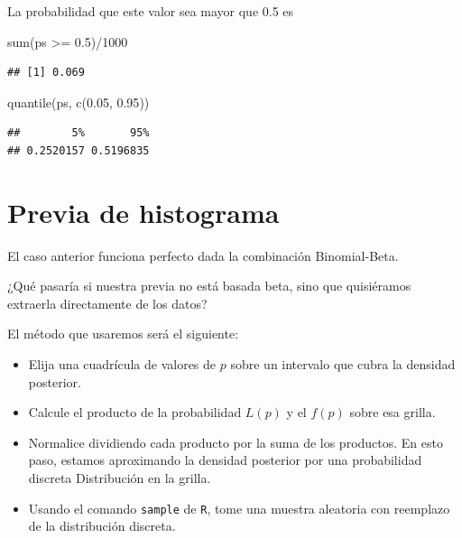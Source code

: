\documentclass[
  12pt,
]{book}
\newenvironment{Shaded}{\begin{snugshade}}{\end{snugshade}}
\newcommand{\DecValTok}[1]{\textcolor[rgb]{0.00,0.00,0.81}{#1}}
\newcommand{\FloatTok}[1]{\textcolor[rgb]{0.00,0.00,0.81}{#1}}
\newcommand{\FunctionTok}[1]{\textcolor[rgb]{0.00,0.00,0.00}{#1}}
\newcommand{\NormalTok}[1]{#1}
\newcommand{\SpecialCharTok}[1]{\textcolor[rgb]{0.00,0.00,0.00}{#1}}
\providecommand{\tightlist}{%
  \setlength{\itemsep}{0pt}\setlength{\parskip}{0pt}}
\theoremstyle{definition}
\theoremstyle{definition}
\theoremstyle{definition}
\theoremstyle{remark}
\begin{document}
La probabilidad que este valor sea mayor que 0.5 es

\begin{Shaded}
\begin{Highlighting}[]
\FunctionTok{sum}\NormalTok{(ps }\SpecialCharTok{\textgreater{}=} \FloatTok{0.5}\NormalTok{)}\SpecialCharTok{/}\DecValTok{1000}
\end{Highlighting}
\end{Shaded}

\begin{verbatim}
## [1] 0.069
\end{verbatim}

\begin{Shaded}
\begin{Highlighting}[]
\FunctionTok{quantile}\NormalTok{(ps, }\FunctionTok{c}\NormalTok{(}\FloatTok{0.05}\NormalTok{, }\FloatTok{0.95}\NormalTok{))}
\end{Highlighting}
\end{Shaded}

\begin{verbatim}
##        5%       95% 
## 0.2520157 0.5196835
\end{verbatim}

\hypertarget{previa-de-histograma}{%
\section{Previa de histograma}\label{previa-de-histograma}}

El caso anterior funciona perfecto dada la combinación Binomial-Beta.

¿Qué pasaría si nuestra previa no está basada beta, sino que
quisiéramos extraerla directamente de los datos?

El método que usaremos será el siguiente:

\begin{itemize}
\tightlist
\item
  Elija una cuadrícula de valores de \(p\) sobre un intervalo que cubra
  la densidad posterior.
\item
  Calcule el producto de la probabilidad \(L (p)\) y el \(f (p)\) sobre
  esa grilla.
\item
  Normalice dividiendo cada producto por la suma de los productos. En
  esto paso, estamos aproximando la densidad posterior por una
  probabilidad discreta Distribución en la grilla.
\item
  Usando el comando \texttt{sample} de \texttt{R}, tome una muestra aleatoria con
  reemplazo de la distribución discreta.
\end{itemize}
\end{document}
